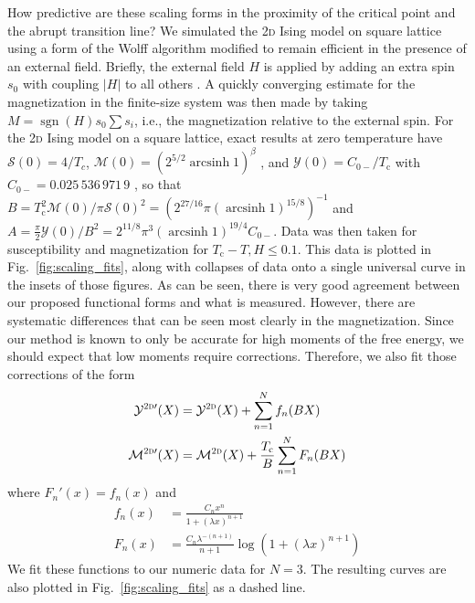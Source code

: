 \documentclass[aps,prl,reprint]{revtex4-1}
\def\[{\begin{equation}}
\def\]{\end{equation}}
\def\arcsinh{\mathop{\mathrm{arcsinh}}\nolimits}
\def\sgn{\mathop{\mathrm{sgn}}\nolimits}
\def\c{\mathrm c}
\def\fM{\mathcal M}  %
\def\fX{\mathcal Y}  %
\def\fS{\mathcal S}  %
\def\twodee{\textsc{2d} }
\begin{document}
How predictive are these scaling forms in the proximity of the critical point
and the abrupt transition line? We simulated the \twodee Ising model on square lattice using a form of the Wolff algorithm modified
to remain efficient in the presence of an external field. Briefly, the external field $H$ is applied by adding an extra spin $s_0$ with coupling $|H|$ to all others
\cite{dimitrovic.1991.finite}. A quickly converging estimate for the magnetization in the finite-size system was then made by taking $M=\sgn(H)s_0\sum s_i$, i.e., the magnetization relative to the external spin. For the \twodee Ising model on a square lattice, exact results at zero temperature have $\fS(0)=4/T_c$, $\fM(0)=(2^{5/2}\arcsinh1)^\beta$ \cite{onsager.1944.crystal}, and $\fX(0)=C_{0-}/T_\c$ with $C_{0-}=0.025\,536\,971\,9$
\cite{barouch.1973.susceptibility}, so that $B=T_\c^2\fM(0)/\pi\fS(0)^2=(2^{27/16}\pi(\arcsinh1)^{15/8})^{-1}$ and $A=\frac\pi2\fX(0)/B^2=2^{11/8}\pi^3(\arcsinh1)^{19/4}C_{0-}$. 
Data was then taken for susceptibility and
magnetization for $T_\c-T,H\leq0.1$. This data is plotted in
Fig.~\ref{fig:scaling_fits}, along with collapses of data onto a single universal curve
in the insets of those figures. As can be seen, there is very good agreement
between our proposed functional forms and what is measured.
However, there are systematic differences that can be seen most clearly in the
magnetization. Since our method is known to only be accurate for high moments
of the free energy, we should expect that low moments require corrections.
Therefore, we also fit those corrections of the form
\begin{align}
  \fX^{\twodee\prime}(X)&=\fX^\twodee(X)+\sum_{n=1}^Nf_n(BX)\\
  \fM^{\twodee\prime}(X)&=\fM^\twodee(X)+\frac{T_\c}B\sum_{n=1}^NF_n(BX)
\end{align}
where $F_n'(x)=f_n(x)$ and
\[
  \begin{aligned}
    f_n(x)&=\frac{C_nx^n}{1+(\lambda x)^{n+1}}\\
    F_n(x)&=\frac{C_n\lambda^{-(n+1)}}{n+1}\log(1+(\lambda x)^{n+1})
  \end{aligned}
  \label{eq:poly}
\]
We fit these functions to our numeric data for $N=3$. The resulting curves are
also plotted in Fig.~\ref{fig:scaling_fits} as a dashed line.
\end{document}
